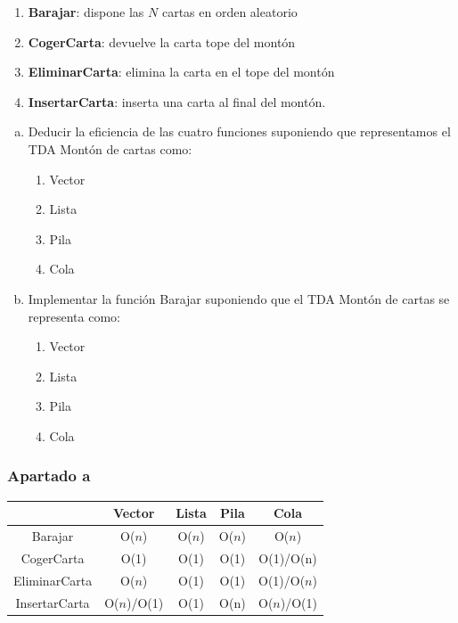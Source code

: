 \documentclass[10pt,a4paper,spanish]{report}
\begin{document}
\begin{enumerate}[$\bullet$]
      \item \textbf{\textcolor[rgb]{0.5,0.8,1}{Barajar}}: dispone las $N$ cartas en orden aleatorio
      \item \textbf{\textcolor[rgb]{0.5,0.8,1}{CogerCarta}}: devuelve la carta tope del montón
      \item \textbf{\textcolor[rgb]{0.5,0.8,1}{EliminarCarta}}: elimina la carta en el tope del montón
      \item \textbf{\textcolor[rgb]{0.5,0.8,1}{InsertarCarta}}: inserta una carta al final del montón.
\end{enumerate}

\begin{enumerate}[a)]
      \item Deducir la eficiencia de las cuatro funciones suponiendo que representamos el TDA Montón de cartas como:
      \begin{enumerate}[1)]
            \item Vector
            \item Lista
            \item Pila
            \item Cola
      \end{enumerate}
      \item Implementar la función Barajar suponiendo que el TDA Montón de cartas se representa como:
      \begin{enumerate}[1)]
            \item Vector
            \item Lista
            \item Pila
            \item Cola
      \end{enumerate}
\end{enumerate}

\subsubsection{\textcolor[rgb]{0.5,0.8,1}Apartado a}
\begin{tabular}{c|c|c|c|c}
& Vector & Lista & Pila & Cola \\
\hline
Barajar & O($n$) & O($n$) & O($n$) & O($n$) \\
CogerCarta & O(1) & O(1) & O(1) & O(1)/O(n) \\
EliminarCarta & O($n$) & O(1) & O(1) & O(1)/O($n$) \\
InsertarCarta & O($n$)/O(1) & O(1) & O(n) & O($n$)/O(1)\\
\end{tabular}
\end{document}
